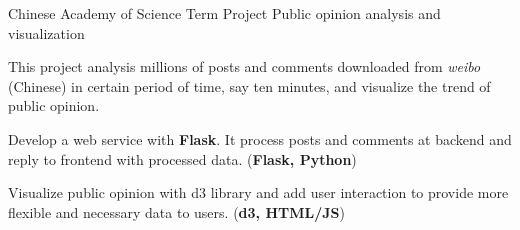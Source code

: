 \begin{cventries}
  \cventry
    {Chinese Academy of Science Term Project} %
    {Public opinion analysis and visualization} %
    {} %
    {} %
    {
      \begin{cvitems} %
      	\item {This project analysis millions of posts and comments downloaded from \textit{weibo} (Chinese) in certain period of time, say ten minutes, and visualize the trend of public opinion. }
        \item {Develop a web service with \textbf{Flask}. It process posts and comments at backend and reply to frontend with processed data. (\textbf{Flask, Python})}
        \item {Visualize public opinion with d3 library and add user interaction to provide more flexible and necessary data to users. (\textbf{d3, HTML/JS})}
      \end{cvitems}
    }
\end{cventries}
